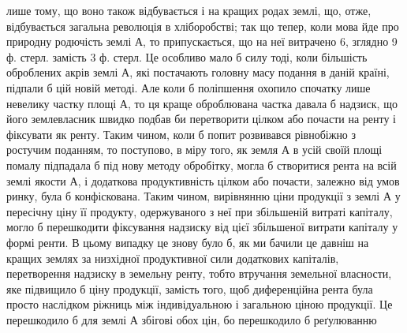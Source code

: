 лише тому, що воно також відбувається і на кращих родах землі, що, отже,
відбувається загальна революція в хліборобстві; так що тепер, коли мова йде
про природну родючість землі $А$, то припускається, що на неї витрачено 6, зглядно
9 ф. стерл. замість 3 ф. стерл. Це особливо мало б силу тоді, коли більшість
оброблених акрів землі $А$, які постачають головну масу подання в даній країні,
підпали б цій новій методі. Але коли б поліпшення охопило спочатку лише
невелику частку площі $А$, то ця краще оброблювана частка давала б надзиск,
що його землевласник швидко подбав би перетворити цілком або почасти
на ренту і фіксувати як ренту. Таким чином, коли б попит розвивався рівнобіжно
з ростучим поданням, то поступово, в міру того, як земля $А$ в усій своїй площі
помалу підпадала б під нову методу обробітку, могла б створитися рента
на всій землі якости $А$, і додаткова продуктивність цілком або почасти, залежно
від умов ринку, була б конфіскована. Таким чином, вирівнянню ціни продукції
з землі $А$ у пересічну ціну її продукту, одержуваного з неї при збільшеній витраті
капіталу, могло б перешкодити фіксування надзиску від цієї збільшеної витрати
капіталу у формі ренти. В цьому випадку це знову було б, як ми бачили це
давніш на кращих землях за низхідної продуктивної сили додаткових капіталів,
перетворення надзиску в земельну ренту, тобто втручання земельної власности,
яке підвищило б ціну продукції, замість того, щоб диференційна рента була
просто наслідком ріжниць між індивідуальною і загальною ціною продукції. Це
перешкодило б для землі $А$ збігові обох цін, бо перешкодило б реґулюванню
\parbreak{}  %
